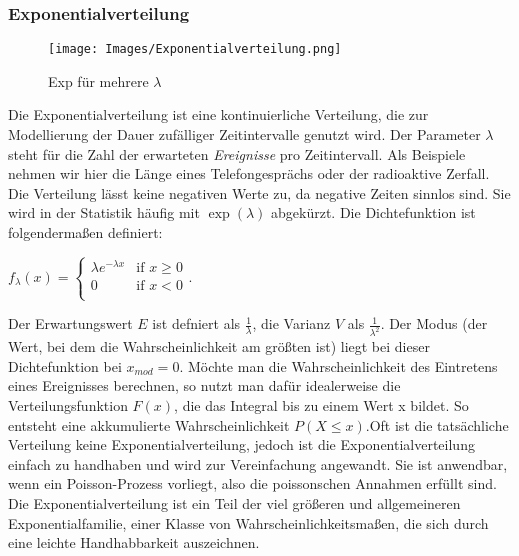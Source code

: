 \documentclass{scrreprt}
\begin{document}
\subsubsection{Exponentialverteilung}\label{Exponentialverteilung}
\begin{wrapfigure}{r}{0.5\textwidth}
    \centering
    \vspace{-22pt}
    \texttt{[image: Images/Exponentialverteilung.png]}
    \caption{Exp für mehrere $\lambda$}
    \label{Figur 7}
\end{wrapfigure}
Die Exponentialverteilung ist eine kontinuierliche Verteilung, die zur Modellierung der Dauer zufälliger Zeitintervalle genutzt wird. Der Parameter $\lambda$ steht für die Zahl der erwarteten \textit{Ereignisse} pro Zeitintervall. Als Beispiele nehmen wir hier die Länge eines Telefongesprächs oder der radioaktive Zerfall. Die Verteilung lässt keine negativen Werte zu, da negative Zeiten sinnlos sind. Sie wird in der Statistik häufig mit $\exp(\lambda)$ abgekürzt. Die Dichtefunktion ist folgendermaßen definiert:
\begin{flushleft}
        $f_{\lambda}(x) =
        \begin{cases}
            \lambda e^{-\lambda x} & \text{if } x \geq 0 \\
            0 & \text{if } x < 0 \\
        \end{cases}$.      
\end{flushleft} 
Der Erwartungswert $E$ ist defniert als $\frac{1}{\lambda}$, die Varianz $V$ als $\frac{1}{\lambda^2}$. Der Modus (der Wert, bei dem die Wahrscheinlichkeit am größten ist) liegt bei dieser Dichtefunktion bei $x_{mod}=0$. Möchte man die Wahrscheinlichkeit des Eintretens eines Ereignisses berechnen, so nutzt man dafür idealerweise die Verteilungsfunktion $F(x)$, die das Integral bis zu einem Wert x bildet. So entsteht eine akkumulierte Wahrscheinlichkeit $P(X\leq x)$.Oft ist die tatsächliche Verteilung keine Exponentialverteilung, jedoch ist die Exponentialverteilung einfach zu handhaben und wird zur Vereinfachung angewandt. Sie ist anwendbar, wenn ein Poisson-Prozess vorliegt, also die poissonschen Annahmen erfüllt sind. Die Exponentialverteilung ist ein Teil der viel größeren und allgemeineren Exponentialfamilie, einer Klasse von Wahrscheinlichkeitsmaßen, die sich durch eine leichte Handhabbarkeit auszeichnen.    
\end{document}

